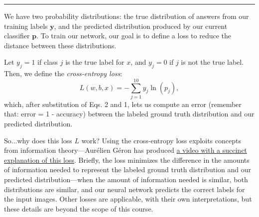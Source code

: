 \hspace{\fill}\rule{0.5\linewidth}{.5pt}\hspace{\fill}

We have two probability distributions: the true distribution of answers from our training labels $\mathbf{y}$, and the predicted distribution produced by our current classifier $\mathbf{p}$. To train our network, our goal is to define a loss to reduce the distance between these distributions.

Let $y_j=1$ if class $j$ is the true label for $x$, and $y_j = 0$ if $j$ is not the true label. Then, we define the \emph{cross-entropy loss}:
\begin{equation}
    L(w,b,x) = - \sum_{j=1}^{10}y_j\ln(p_j),
\end{equation}
which, after substitution of Eqs. 2 and 1, lets us compute an error (remember that: error = 1 - accuracy) between the labeled ground truth distribution and our predicted distribution.

So...why does this loss $L$ work? Using the cross-entropy loss exploits concepts from information theory---Aur\'{e}lien G\'{e}ron has produced \href{https://www.youtube.com/watch?v=ErfnhcEV1O8}{a video with a succinct explanation of this loss}. Briefly, the loss minimizes the difference in the amounts of information needed to represent the labeled ground truth distribution and our predicted distribution---when the amount of information needed is similar, both distributions are similar, and our neural network predicts the correct labels for the input images. Other losses are applicable, with their own interpretations, but these details are beyond the scope of this course.

